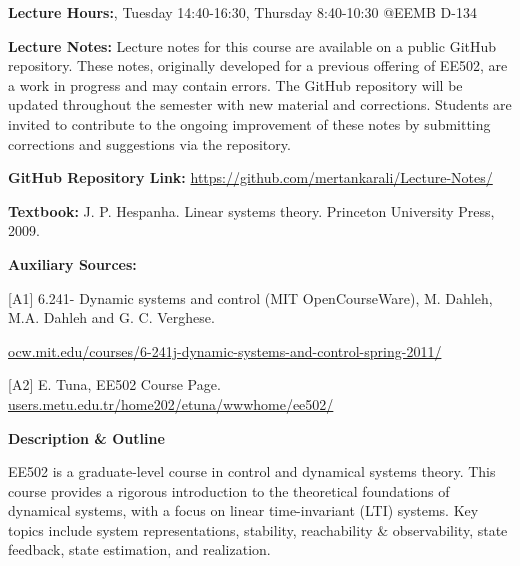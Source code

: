 \documentclass[11pt,oneside]{amsart}
\newcommand{\header}[1]{\bigbreak\textbf{#1}}
\begin{document}
\vspace{9pt}

\textbf{Lecture Hours:}, Tuesday 14:40-16:30, Thursday 8:40-10:30 @EEMB D-134

\vspace{9pt}

\textbf{Lecture Notes:} Lecture notes for this course are available on a public GitHub repository. These notes, originally developed for a previous offering of EE502, are a work in progress and may contain errors.  The GitHub repository will be updated throughout the semester with new material and corrections.  Students are invited to contribute to the ongoing improvement of these notes by submitting corrections and suggestions via the repository.

\vspace{6pt}

\textbf{GitHub Repository Link:} \url{https://github.com/mertankarali/Lecture-Notes/}

\vspace{6pt}

\textbf{Textbook:} J. P. Hespanha. Linear systems theory. Princeton
University Press, 2009.

\vspace{6pt}

\textbf{Auxiliary Sources:}

\vspace{6pt}

[A1] 6.241- Dynamic systems and control (MIT OpenCourseWare),
    M. Dahleh, M.A. Dahleh and G. C. Verghese. 

\url{ocw.mit.edu/courses/6-241j-dynamic-systems-and-control-spring-2011/}

\vspace{6pt}

[A2] E. Tuna, EE502 Course Page. \url{users.metu.edu.tr/home202/etuna/wwwhome/ee502/}

\newpage

\header{Description \& Outline}

\vspace{6pt}

EE502 is a graduate-level course in control and dynamical systems theory. This course provides a rigorous introduction to the theoretical foundations of dynamical systems, with a focus on linear time-invariant (LTI) systems.  Key topics include system representations, stability, reachability \& observability, state feedback, state estimation, and realization.
\end{document}
